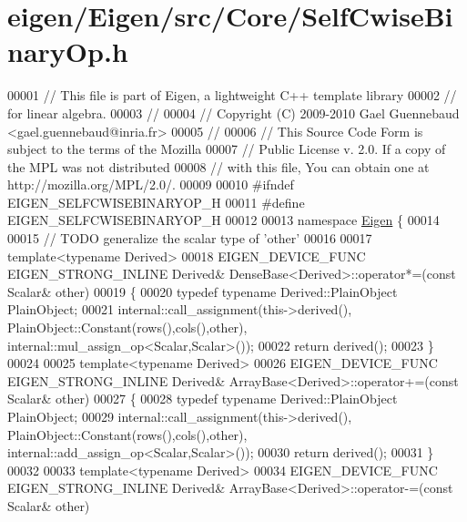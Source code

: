 \hypertarget{eigen_2_eigen_2src_2_core_2_self_cwise_binary_op_8h_source}{}\section{eigen/\+Eigen/src/\+Core/\+Self\+Cwise\+Binary\+Op.h}
\label{eigen_2_eigen_2src_2_core_2_self_cwise_binary_op_8h_source}

\begin{DoxyCode}
00001 \textcolor{comment}{// This file is part of Eigen, a lightweight C++ template library}
00002 \textcolor{comment}{// for linear algebra.}
00003 \textcolor{comment}{//}
00004 \textcolor{comment}{// Copyright (C) 2009-2010 Gael Guennebaud <gael.guennebaud@inria.fr>}
00005 \textcolor{comment}{//}
00006 \textcolor{comment}{// This Source Code Form is subject to the terms of the Mozilla}
00007 \textcolor{comment}{// Public License v. 2.0. If a copy of the MPL was not distributed}
00008 \textcolor{comment}{// with this file, You can obtain one at http://mozilla.org/MPL/2.0/.}
00009 
00010 \textcolor{preprocessor}{#ifndef EIGEN\_SELFCWISEBINARYOP\_H}
00011 \textcolor{preprocessor}{#define EIGEN\_SELFCWISEBINARYOP\_H}
00012 
00013 \textcolor{keyword}{namespace }\hyperlink{namespace_eigen}{Eigen} \{ 
00014 
00015 \textcolor{comment}{// TODO generalize the scalar type of 'other'}
00016 
00017 \textcolor{keyword}{template}<\textcolor{keyword}{typename} Derived>
00018 EIGEN\_DEVICE\_FUNC EIGEN\_STRONG\_INLINE Derived& DenseBase<Derived>::operator*=(\textcolor{keyword}{const} Scalar& other)
00019 \{
00020   \textcolor{keyword}{typedef} \textcolor{keyword}{typename} Derived::PlainObject PlainObject;
00021   internal::call\_assignment(this->derived(), PlainObject::Constant(rows(),cols(),other), 
      internal::mul\_assign\_op<Scalar,Scalar>());
00022   \textcolor{keywordflow}{return} derived();
00023 \}
00024 
00025 \textcolor{keyword}{template}<\textcolor{keyword}{typename} Derived>
00026 EIGEN\_DEVICE\_FUNC EIGEN\_STRONG\_INLINE Derived& ArrayBase<Derived>::operator+=(\textcolor{keyword}{const} Scalar& other)
00027 \{
00028   \textcolor{keyword}{typedef} \textcolor{keyword}{typename} Derived::PlainObject PlainObject;
00029   internal::call\_assignment(this->derived(), PlainObject::Constant(rows(),cols(),other), 
      internal::add\_assign\_op<Scalar,Scalar>());
00030   \textcolor{keywordflow}{return} derived();
00031 \}
00032 
00033 \textcolor{keyword}{template}<\textcolor{keyword}{typename} Derived>
00034 EIGEN\_DEVICE\_FUNC EIGEN\_STRONG\_INLINE Derived& ArrayBase<Derived>::operator-=(\textcolor{keyword}{const} Scalar& other)

\end{DoxyCode}

